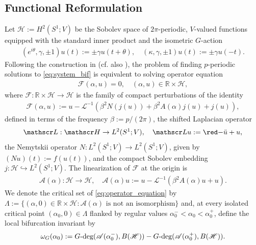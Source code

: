 \documentclass[twoside]{article}%
\def\br{\mathbb R}
\def\gdeg{G\text{\rm -deg}}
\begin{document}
\subsection{Functional Reformulation} \label{sec:functional_reformulation}
Let $\mathscr H := H^2(S^1; V)$ be the Sobolev space of $2\pi$-periodic, $V$-valued functions equipped with the standard inner product and the isometric $G$-action
\begin{align*}
(e^{i\theta}, \gamma, \pm 1)u(t) := \pm \gamma u(t + \theta), \quad 
(\kappa, \gamma, \pm 1)u(t) := \pm \gamma u(-t).
\end{align*}
Following the construction in \cite{Ghanem_annales} (cf. also \cite{Carlos2019}), the problem of finding $p$-periodic solutions to \eqref{eq:system_bif} is equivalent to solving operator equation
\begin{align}\label{eq:operator_equation}
\mathscr F(\alpha,u) = 0, \quad (\alpha,u) \in \br \times \mathscr H,    
\end{align}
where $\mathscr  F: \br \times \mathscr H \rightarrow \mathscr H$ is the family of compact perturbations of the identity
\begin{align} \label{def:operator_F}
\mathscr  F(\alpha,u) := u - \mathscr L^{-1}(\beta^2 N(j(u)) + \beta^2 A(\alpha) j(u) + j(u)),
\end{align}
defined in terms of the frequency $\beta:= p/(2\pi)$, the shifted Laplacian operator
\begin{align}\label{def:operator_L}
    \mathscr L: \mathscr H \rightarrow L^2(S^1;V), \quad \mathscr L u := {\red -}\ddot u + u,
\end{align}
the Nemytskii operator  $N:L^2(S^1;V) \rightarrow L^2(S^1;V)$, given by
$(Nu)(t) :=  f(u(t))$, and the compact Sobolev embedding $j:\mathscr H \hookrightarrow L^2(S^1;V)$.  The linearization of $\mathscr F$
at the origin is
\begin{align*}
\mathscr  A(\alpha): \mathscr H \rightarrow \mathscr H, \quad \mathscr  A(\alpha)u := u - \mathscr L^{-1}(\beta^2 A(\alpha) u + u).
\end{align*}
We denote the critical set of \eqref{eq:operator_equation} by
$\Lambda := \{(\alpha,0) \in \br \times \mathscr H :
\mathscr A(\alpha) \text{ is not an isomorphism}\}$ and, at every isolated critical point $(\alpha_0,0) \in \Lambda$ flanked by regular values $\alpha_0^- < \alpha_0 < \alpha_0^+$, define the local
bifurcation invariant by
\[
\omega_{G}(\alpha_0) := \gdeg(\mathscr A(\alpha_0^-),B(\mathscr H)) - \gdeg(\mathscr A(\alpha_0^+),B(\mathscr H)).
\]
\end{document}
